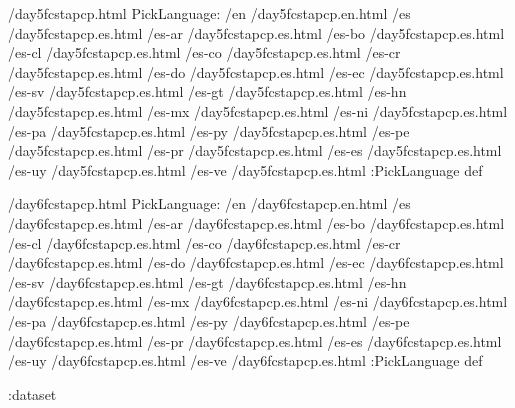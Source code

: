 \begin{ingrid}
/day5fcstapcp.html {
PickLanguage:
/en /day5fcstapcp.en.html
/es /day5fcstapcp.es.html
/es-ar /day5fcstapcp.es.html
/es-bo /day5fcstapcp.es.html
/es-cl /day5fcstapcp.es.html
/es-co /day5fcstapcp.es.html
/es-cr /day5fcstapcp.es.html
/es-do /day5fcstapcp.es.html
/es-ec /day5fcstapcp.es.html
/es-sv /day5fcstapcp.es.html
/es-gt /day5fcstapcp.es.html
/es-hn /day5fcstapcp.es.html
/es-mx /day5fcstapcp.es.html
/es-ni /day5fcstapcp.es.html
/es-pa /day5fcstapcp.es.html
/es-py /day5fcstapcp.es.html
/es-pe /day5fcstapcp.es.html
/es-pr /day5fcstapcp.es.html
/es-es /day5fcstapcp.es.html
/es-uy /day5fcstapcp.es.html
/es-ve /day5fcstapcp.es.html
:PickLanguage
} def

/day6fcstapcp.html {
PickLanguage:
/en /day6fcstapcp.en.html
/es /day6fcstapcp.es.html
/es-ar /day6fcstapcp.es.html
/es-bo /day6fcstapcp.es.html
/es-cl /day6fcstapcp.es.html
/es-co /day6fcstapcp.es.html
/es-cr /day6fcstapcp.es.html
/es-do /day6fcstapcp.es.html
/es-ec /day6fcstapcp.es.html
/es-sv /day6fcstapcp.es.html
/es-gt /day6fcstapcp.es.html
/es-hn /day6fcstapcp.es.html
/es-mx /day6fcstapcp.es.html
/es-ni /day6fcstapcp.es.html
/es-pa /day6fcstapcp.es.html
/es-py /day6fcstapcp.es.html
/es-pe /day6fcstapcp.es.html
/es-pr /day6fcstapcp.es.html
/es-es /day6fcstapcp.es.html
/es-uy /day6fcstapcp.es.html
/es-ve /day6fcstapcp.es.html
:PickLanguage
} def

:dataset
\end{ingrid}
